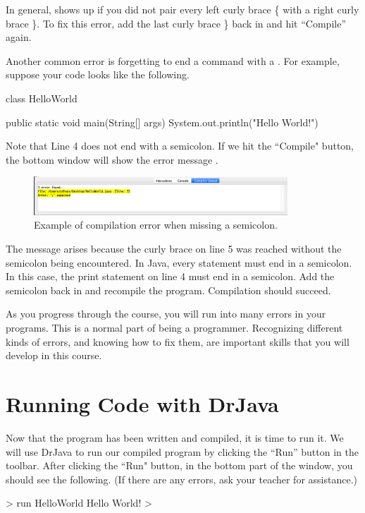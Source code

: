 In general,  shows up if you did not pair every left curly brace \{ with a right curly brace \}.
To fix this error, add the last curly brace \} back in and hit ``Compile'' again.

Another common error is forgetting to end a command with a \;. For example, suppose your code looks like the following.

\begin{code}
class HelloWorld {
    
    public static void main(String[] args) {
        System.out.println("Hello World!")
    }
}
\end{code}

Note that Line 4 does not end with a semicolon. If we hit the ``Compile" button, the bottom window will show the error message .

\begin{figure}[ht]
	\centering
	\includegraphics[width=0.85\textwidth]{images/hello_world_error2.png}
	\caption{Example of compilation error when missing a semicolon.}
	\label{fig:helloworld:sec:error2}
\end{figure}

The message  arises because the curly brace on line 5 was reached without the semicolon being
encountered. In Java, every statement must end in a semicolon. In this case, the print statement on line 4 must
end in a semicolon. Add the semicolon back in and recompile the program. Compilation should succeed.

As you progress through the course, you will run into many errors in your programs. This is a normal part of being a programmer. Recognizing different kinds of errors, and knowing how to fix them, are important skills that you will develop in this course.

\section{Running Code with DrJava}
Now that the program has been written and compiled, it is time to run it.
We will use DrJava to run our compiled program by clicking the ``Run'' button in the toolbar. After clicking the ``Run" button, in the bottom part of the window, you should see the following. (If there are any errors, ask your teacher for assistance.)
\begin{code}
> run HelloWorld
Hello World!
>
\end{code}

